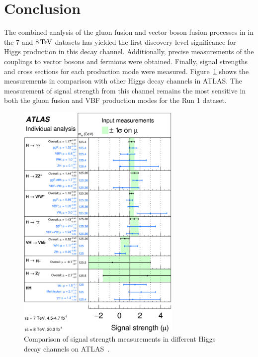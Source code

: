 \section{Conclusion}

The combined analysis of the gluon fusion and vector boson fusion processes in \HWWfull in the $7$ and $8 \TeV$ datasets has yielded the first discovery level significance for Higgs production in this decay channel. Additionally, precise measurements of the couplings to vector bosons and fermions were obtained. Finally, signal strengths and cross sections for each production mode were measured. Figure~\ref{fig:mu_summary} shows the \HWWfull measurements in comparison with other Higgs decay channels in ATLAS. The measurement of signal strength from this channel remains the most sensitive in both the gluon fusion and VBF production modes for the Run 1 dataset. 

\begin{figure}[h!]
  \centering
  \captionsetup{justification=centering}

  \includegraphics[width=0.7\textwidth]{figures/mu_summary}
  \caption{Comparison of signal strength measurements in different Higgs decay channels on ATLAS~\cite{HiggsSummaryRun1}.}
  \label{fig:mu_summary}
\end{figure}

